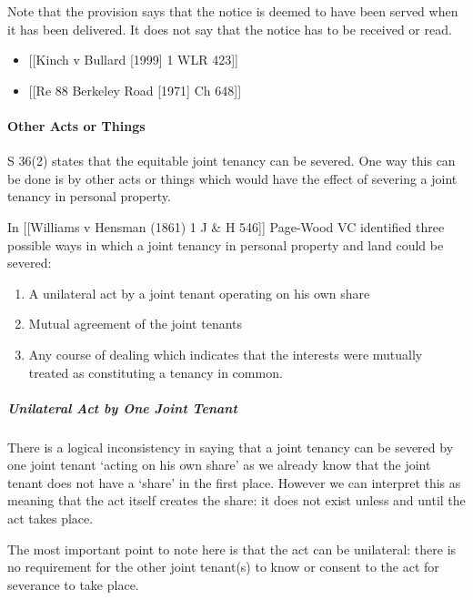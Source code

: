 \documentclass[
]{article}
\providecommand{\tightlist}{%
  \setlength{\itemsep}{0pt}\setlength{\parskip}{0pt}}
\begin{document}
Note that the provision says that the notice is deemed to have been
served when it has been delivered. It does not say that the notice has
to be received or read.

\begin{itemize}
\tightlist
\item
  {[}{[}Kinch v Bullard {[}1999{]} 1 WLR 423{]}{]}
\item
  {[}{[}Re 88 Berkeley Road {[}1971{]} Ch 648{]}{]}
\end{itemize}

\hypertarget{other-acts-or-things}{%
\paragraph{Other Acts or Things}\label{other-acts-or-things}}

S 36(2) states that the equitable joint tenancy can be severed. One way
this can be done is by other acts or things which would have the effect
of severing a joint tenancy in personal property.

In {[}{[}Williams v Hensman (1861) 1 J \& H 546{]}{]} Page-Wood VC
identified three possible ways in which a joint tenancy in personal
property and land could be severed:

\begin{enumerate}
\def\labelenumi{(\arabic{enumi})}
\tightlist
\item
  A unilateral act by a joint tenant operating on his own share\\
\item
  Mutual agreement of the joint tenants\\
\item
  Any course of dealing which indicates that the interests were mutually
  treated as constituting a tenancy in common.
\end{enumerate}

\hypertarget{unilateral-act-by-one-joint-tenant}{%
\subparagraph{Unilateral Act by One Joint
Tenant}\label{unilateral-act-by-one-joint-tenant}}

There is a logical inconsistency in saying that a joint tenancy can be
severed by one joint tenant `acting on his own share' as we already know
that the joint tenant does not have a `share' in the first place.
However we can interpret this as meaning that the act itself creates the
share: it does not exist unless and until the act takes place.

The most important point to note here is that the act can be unilateral:
there is no requirement for the other joint tenant(s) to know or consent
to the act for severance to take place.
\end{document}
